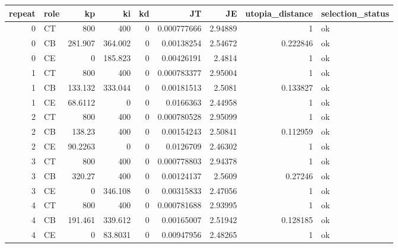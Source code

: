 \begin{tabular}{rlrrrrrrl}
\toprule
repeat & role & kp & ki & kd & JT & JE & utopia\_distance & selection\_status \\
\midrule
0 & CT & 800 & 400 & 0 & 0.000777666 & 2.94889 & 1 & ok \\
0 & CB & 281.907 & 364.002 & 0 & 0.00138254 & 2.54672 & 0.222846 & ok \\
0 & CE & 0 & 185.823 & 0 & 0.00426191 & 2.4814 & 1 & ok \\
1 & CT & 800 & 400 & 0 & 0.000783377 & 2.95004 & 1 & ok \\
1 & CB & 133.132 & 333.044 & 0 & 0.00181513 & 2.5081 & 0.133827 & ok \\
1 & CE & 68.6112 & 0 & 0 & 0.0166363 & 2.44958 & 1 & ok \\
2 & CT & 800 & 400 & 0 & 0.000780528 & 2.95099 & 1 & ok \\
2 & CB & 138.23 & 400 & 0 & 0.00154243 & 2.50841 & 0.112959 & ok \\
2 & CE & 90.2263 & 0 & 0 & 0.0126709 & 2.46302 & 1 & ok \\
3 & CT & 800 & 400 & 0 & 0.000778803 & 2.94378 & 1 & ok \\
3 & CB & 320.27 & 400 & 0 & 0.00124137 & 2.5609 & 0.27246 & ok \\
3 & CE & 0 & 346.108 & 0 & 0.00315833 & 2.47056 & 1 & ok \\
4 & CT & 800 & 400 & 0 & 0.000781688 & 2.93995 & 1 & ok \\
4 & CB & 191.461 & 339.612 & 0 & 0.00165007 & 2.51942 & 0.128185 & ok \\
4 & CE & 0 & 83.8031 & 0 & 0.00947956 & 2.48265 & 1 & ok \\
\bottomrule
\end{tabular}
